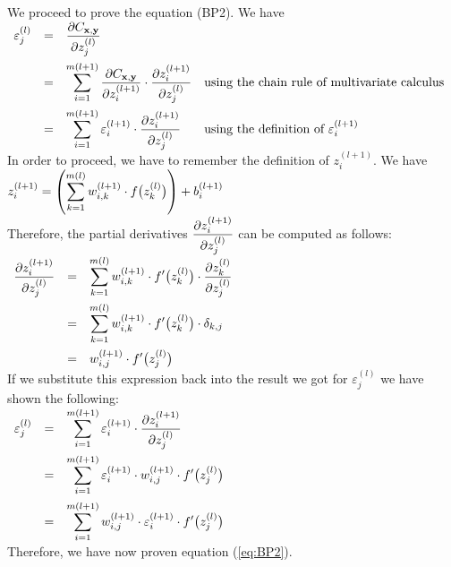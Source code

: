 \noindent
We proceed to prove the equation (BP2). We have
\\[0.2cm]
\hspace*{1.3cm}
$
\begin{array}{lcll}
\varepsilon_j^{(l)} 
& = & \displaystyle \frac{\partial C_{\mathbf{x}, \mathbf{y}}}{\partial z_j^{(l)}} \\[0.5cm]
& = & \displaystyle \sum\limits_{i=1}^{m(l+1)} 
      \frac{\partial C_{\mathbf{x}, \mathbf{y}}}{\partial z_i^{(l+1)}} \cdot \frac{\partial z_i^{(l+1)}}{\partial z_j^{(l)}}
    & \mbox{using the chain rule of multivariate calculus}
      \\[0.5cm]
& = & \displaystyle \sum\limits_{i=1}^{m(l+1)} 
      \varepsilon_i^{(l+1)} \cdot \frac{\partial z_i^{(l+1)}}{\partial z_j^{(l)}}
      & \mbox{using the definition of $\varepsilon_i^{(l+1)}$}     
\end{array}
$
\\[0.2cm]
In order to proceed, we have to remember the definition of $z_i^{(l+1)}$.  We have
\\[0.2cm]
\hspace*{1.3cm}
$\displaystyle z_i^{(l+1)} = \left(\sum\limits_{k=1}^{m(l)} w_{i,k}^{(l+1)} \cdot f\bigl(z_k^{(l)}\bigr)\right) + b_i^{(l+1)}$
\\[0.2cm]
Therefore, the partial derivatives $\displaystyle\frac{\partial z_i^{(l+1)}}{\partial z_j^{(l)}}$ 
can be computed as follows:
\\[0.2cm]
\hspace*{1.3cm}
$
\begin{array}{lcl}
      \displaystyle \frac{\partial z_i^{(l+1)}}{\partial z_j^{(l)}} 
& = & \displaystyle \sum\limits_{k=1}^{m(l)} 
      w_{i,k}^{(l+1)} \cdot f'\bigl(z_k^{(l)}\bigr) \cdot \frac{\partial z_k^{(l)}}{\partial z_j^{(l)}} 
      \\[0.5cm]
& = & \displaystyle \sum\limits_{k=1}^{m(l)} 
      w_{i,k}^{(l+1)} \cdot f'\bigl(z_k^{(l)}\bigr) \cdot \delta_{k,j}
      \\[0.5cm]
& = & \displaystyle w_{i,j}^{(l+1)} \cdot f'\bigl(z_j^{(l)}\bigr) 
\end{array}
$
\\[0.2cm]
If we substitute this expression back into the result we got for $\varepsilon_j^{(l)}$ we have shown the following:
\\[0.2cm]
\hspace*{1.3cm}
$
\begin{array}{lcll}
\varepsilon_j^{(l)} 
& = & \displaystyle \sum\limits_{i=1}^{m(l+1)} 
      \varepsilon_i^{(l+1)} \cdot \frac{\partial z_i^{(l+1)}}{\partial z_j^{(l)}}
      \\[0.5cm]
& = & \displaystyle \sum\limits_{i=1}^{m(l+1)} 
      \varepsilon_i^{(l+1)} \cdot w_{i,j}^{(l+1)} \cdot f'\bigl(z_j^{(l)}\bigr) 
      \\[0.5cm]
& = & \displaystyle \sum\limits_{i=1}^{m(l+1)} 
      w_{i,j}^{(l+1)} \cdot \varepsilon_i^{(l+1)} \cdot f'\bigl(z_j^{(l)}\bigr) 
\end{array}
$
\\[0.2cm]
Therefore, we have now proven equation (\ref{eq:BP2}).  


